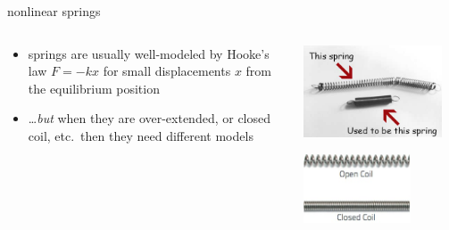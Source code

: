 \documentclass[urlcolor=blue,dvipsnames]{beamer}
\begin{document}
\begin{frame}{nonlinear springs}

\begin{columns}
\begin{column}{0.65\textwidth}
\begin{itemize}
\item springs are usually well-modeled by Hooke's law $F=-kx$ for small displacements $x$ from the equilibrium position
\item \dots \emph{but} when they are over-extended, or closed coil, etc.~then they need different models
\end{itemize}
\end{column}
\begin{column}{0.35\textwidth}
\includegraphics[width=0.9\textwidth]{figs/spring-failure}

\vspace{3mm}

\includegraphics[width=0.7\textwidth]{figs/open-closed-spring}
\end{column}
\end{columns}

\bigskip


\end{frame}
\end{document}
